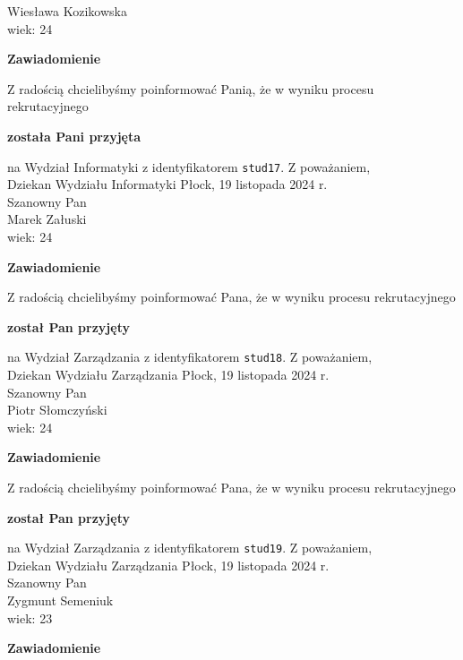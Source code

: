 \documentclass[12pt,a4paper]{article}
\begin{document}
Wiesława Kozikowska \\
wiek: 24
\bigskip
\begin{center}
    {\Large\textbf{Zawiadomienie}}
\end{center}
\bigskip 
Z radością chcielibyśmy poinformować Panią, że w wyniku procesu rekrutacyjnego
\begin{center}
\textsf{\textbf{została Pani przyjęta}}
\end{center}
na Wydział Informatyki z identyfikatorem \verb|stud17|. 
\vspace{2cm}
\noindent
Z poważaniem, \\
Dziekan
Wydziału Informatyki
\newpage
\hfill Płock, 19 listopada 2024 r. \\
\noindent
Szanowny Pan \\
Marek Załuski \\
wiek: 24
\bigskip
\begin{center}
    {\Large\textbf{Zawiadomienie}}
\end{center}
\bigskip 
Z radością chcielibyśmy poinformować Pana, że w wyniku procesu rekrutacyjnego
\begin{center}
\textsf{\textbf{został Pan przyjęty}}
\end{center}
na Wydział Zarządzania z identyfikatorem \verb|stud18|. 
\vspace{2cm}
\noindent
Z poważaniem, \\
Dziekan
Wydziału Zarządzania
\newpage
\hfill Płock, 19 listopada 2024 r. \\
\noindent
Szanowny Pan \\
Piotr Słomczyński \\
wiek: 24
\bigskip
\begin{center}
    {\Large\textbf{Zawiadomienie}}
\end{center}
\bigskip 
Z radością chcielibyśmy poinformować Pana, że w wyniku procesu rekrutacyjnego
\begin{center}
\textsf{\textbf{został Pan przyjęty}}
\end{center}
na Wydział Zarządzania z identyfikatorem \verb|stud19|. 
\vspace{2cm}
\noindent
Z poważaniem, \\
Dziekan
Wydziału Zarządzania
\newpage
\hfill Płock, 19 listopada 2024 r. \\
\noindent
Szanowny Pan \\
Zygmunt Semeniuk  \\
wiek: 23
\bigskip
\begin{center}
    {\Large\textbf{Zawiadomienie}}
\end{center}
\end{document}
